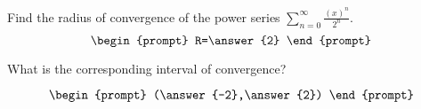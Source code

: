 \documentclass{ximera}
\author{Gregory Hartman \and Matthew Carr}
\begin{document}
\begin{exercise}




Find the radius of convergence of the power series $\sum_{n=0}^{\infty}\frac{(x)^{n}}{2^n}$.
\[
\begin{prompt}
R=\answer{2}
\end{prompt}
\]

What is the corresponding interval of convergence?

\[
\begin{prompt}
(\answer{-2},\answer{2})
\end{prompt}
\]

\end{exercise}
\end{document}

